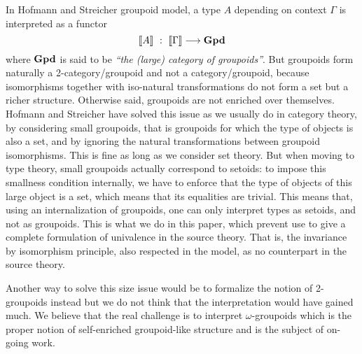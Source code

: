 In Hofmann and Streicher groupoid model, a type $A$ depending on
context $\Gamma$ is interpreted as a functor 
$$
\sem{A} \ : \ \sem{\Gamma} \longrightarrow \GPD
$$
%
where $\mathbf{Gpd}$ is said to be \emph{``the (large) category of groupoids''}. 
%
But groupoids form naturally a 2-category/groupoid and not a
category/groupoid, because isomorphisms together with iso-natural
transformations do not form a set but a richer structure. Otherwise
said, groupoids are not enriched over themselves.
%
Hofmann and Streicher have solved this issue as we usually do in
category theory, by considering small groupoids, that is groupoids for
which the type of objects is also a set, and by ignoring the natural
transformations between groupoid isomorphisms. This is fine as long as we consider set theory.
%
But when moving to type theory, small groupoids actually correspond to
setoids: to impose this smallness condition internally, we have
to enforce that the type of objects of this large object is a set, 
which means that its equalities are trivial. 
%
This means that, using an internalization of groupoids, one can only
interpret types as setoids, and not as groupoids. This is what we do
in this paper, which prevent use to give a complete formulation of
univalence in the source theory. That is, the invariance by
isomorphism principle, also respected in the model, as no counterpart
in the source theory. 

Another way to solve this size issue would be to formalize the notion of
2-groupoids instead but we do not think that the interpretation would
have gained much. We believe that the real challenge is to interpret
$\omega$-groupoids which is the proper notion of self-enriched 
groupoid-like structure and is the subject of on-going work.



